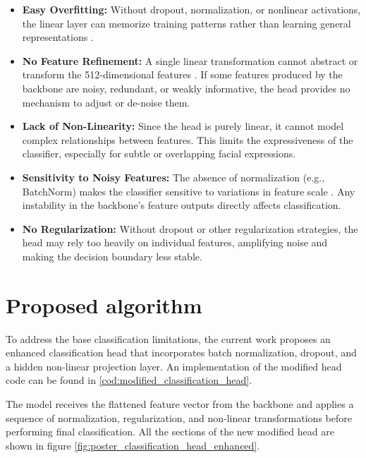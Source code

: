 \begin{itemize}
    \item \textbf{Easy Overfitting:} 
    Without dropout, normalization, or nonlinear activations, the linear layer can memorize training patterns rather than learning general representations \cite{dosovitskiy_image_2021}. 

    \item \textbf{No Feature Refinement:} 
    A single linear transformation cannot abstract or transform the 512-dimensional features \cite{steiner_how_2022, tolstikhin_mlp-mixer_2021}. If some features produced by the backbone are noisy, redundant, or weakly informative, the head provides no mechanism to adjust or de-noise them.

    \item \textbf{Lack of Non-Linearity:} 
Since the head is purely linear, it cannot model complex relationships between features. This limits the expressiveness of the classifier, especially for subtle or overlapping facial expressions.

    \item \textbf{Sensitivity to Noisy Features:} 
The absence of normalization (e.g., BatchNorm) makes the classifier sensitive to variations in feature scale \cite{steiner_how_2022}. Any instability in the backbone's feature outputs directly affects classification.

    \item \textbf{No Regularization:} 
Without dropout or other regularization strategies, the head may rely too heavily on individual features, amplifying noise and making the decision boundary less stable.
\end{itemize}






\section{Proposed algorithm}

To address the base classification limitations, the current work proposes an enhanced classification head that incorporates batch normalization, dropout, and a hidden non-linear projection layer. An implementation of the modified head code can be found in \ref{cod:modified_classification_head}.

 The model receives the flattened feature vector from the backbone and applies a sequence of normalization, regularization, 
and non-linear transformations before performing final classification. All the sections of the new modified head are shown in figure \ref{fig:poster_classification_head_enhanced}. 



